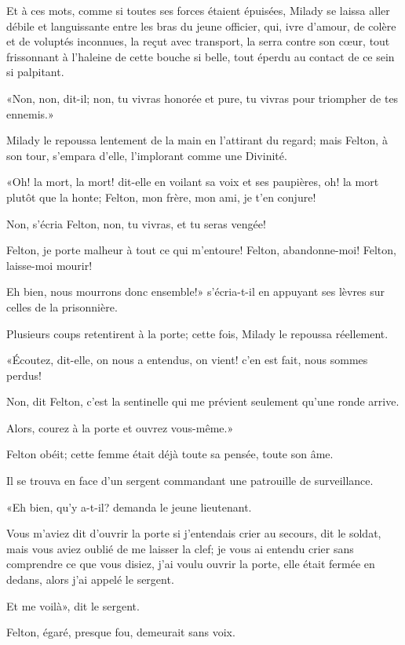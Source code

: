 Et à ces mots, comme si toutes ses forces étaient épuisées, Milady se laissa aller débile et languissante entre les bras du jeune officier, qui, ivre d'amour, de colère et de voluptés inconnues, la reçut avec transport, la serra contre son cœur, tout frissonnant à l'haleine de cette bouche si belle, tout éperdu au contact de ce sein si palpitant. 

«Non, non, dit-il; non, tu vivras honorée et pure, tu vivras pour triompher de tes ennemis.» 

Milady le repoussa lentement de la main en l'attirant du regard; mais Felton, à son tour, s'empara d'elle, l'implorant comme une Divinité. 

«Oh! la mort, la mort! dit-elle en voilant sa voix et ses paupières, oh! la mort plutôt que la honte; Felton, mon frère, mon ami, je t'en conjure! 

\speak  Non, s'écria Felton, non, tu vivras, et tu seras vengée! 

\speak  Felton, je porte malheur à tout ce qui m'entoure! Felton, abandonne-moi! Felton, laisse-moi mourir! 

\speak  Eh bien, nous mourrons donc ensemble!» s'écria-t-il en appuyant ses lèvres sur celles de la prisonnière. 

Plusieurs coups retentirent à la porte; cette fois, Milady le repoussa réellement. 

«Écoutez, dit-elle, on nous a entendus, on vient! c'en est fait, nous sommes perdus! 

\speak  Non, dit Felton, c'est la sentinelle qui me prévient seulement qu'une ronde arrive. 

\speak  Alors, courez à la porte et ouvrez vous-même.» 

Felton obéit; cette femme était déjà toute sa pensée, toute son âme. 

Il se trouva en face d'un sergent commandant une patrouille de surveillance. 

«Eh bien, qu'y a-t-il? demanda le jeune lieutenant. 

\speak  Vous m'aviez dit d'ouvrir la porte si j'entendais crier au secours, dit le soldat, mais vous aviez oublié de me laisser la clef; je vous ai entendu crier sans comprendre ce que vous disiez, j'ai voulu ouvrir la porte, elle était fermée en dedans, alors j'ai appelé le sergent. 

\speak  Et me voilà», dit le sergent. 

Felton, égaré, presque fou, demeurait sans voix. 

